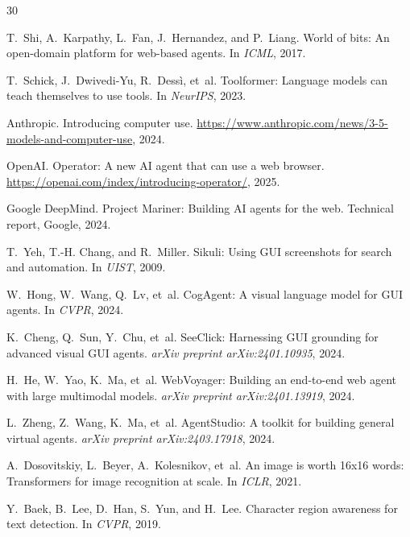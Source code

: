 \documentclass[11pt,twocolumn]{article}
\begin{document}
\begin{thebibliography}{30}

T.~Shi, A.~Karpathy, L.~Fan, J.~Hernandez, and P.~Liang.
\newblock World of bits: An open-domain platform for web-based agents.
\newblock In \emph{ICML}, 2017.

T.~Schick, J.~Dwivedi-Yu, R.~Dess{\`i}, et~al.
\newblock Toolformer: Language models can teach themselves to use tools.
\newblock In \emph{NeurIPS}, 2023.

Anthropic.
\newblock Introducing computer use.
\newblock \url{https://www.anthropic.com/news/3-5-models-and-computer-use}, 2024.

OpenAI.
\newblock Operator: A new AI agent that can use a web browser.
\newblock \url{https://openai.com/index/introducing-operator/}, 2025.

Google DeepMind.
\newblock Project Mariner: Building AI agents for the web.
\newblock Technical report, Google, 2024.

T.~Yeh, T.-H. Chang, and R.~Miller.
\newblock Sikuli: Using GUI screenshots for search and automation.
\newblock In \emph{UIST}, 2009.

W.~Hong, W.~Wang, Q.~Lv, et~al.
\newblock CogAgent: A visual language model for GUI agents.
\newblock In \emph{CVPR}, 2024.

K.~Cheng, Q.~Sun, Y.~Chu, et~al.
\newblock SeeClick: Harnessing GUI grounding for advanced visual GUI agents.
\newblock \emph{arXiv preprint arXiv:2401.10935}, 2024.

H.~He, W.~Yao, K.~Ma, et~al.
\newblock WebVoyager: Building an end-to-end web agent with large multimodal models.
\newblock \emph{arXiv preprint arXiv:2401.13919}, 2024.

L.~Zheng, Z.~Wang, K.~Ma, et~al.
\newblock AgentStudio: A toolkit for building general virtual agents.
\newblock \emph{arXiv preprint arXiv:2403.17918}, 2024.

A.~Dosovitskiy, L.~Beyer, A.~Kolesnikov, et~al.
\newblock An image is worth 16x16 words: Transformers for image recognition at scale.
\newblock In \emph{ICLR}, 2021.

Y.~Baek, B.~Lee, D.~Han, S.~Yun, and H.~Lee.
\newblock Character region awareness for text detection.
\newblock In \emph{CVPR}, 2019.


\end{thebibliography}
\end{document}
